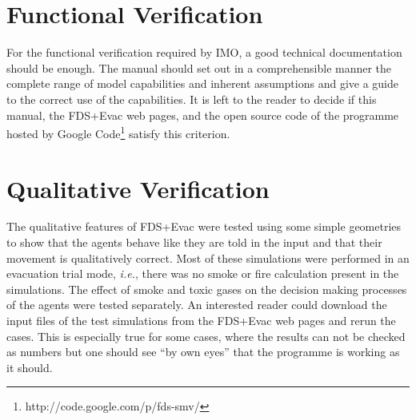 \documentclass[12pt,a4paper,final,twoside]{stylevk}
\begin{document}
\section{Functional Verification}\label{Sec_FuncVeri}

\noindent For the functional verification required by IMO, a good
technical documentation should be enough.  The manual should set out
in a comprehensible manner the complete range of model capabilities
and inherent assumptions and give a guide to the correct use of the
capabilities.  It is left to the reader to decide if this manual, the
FDS+Evac web pages, and the open source code of the programme hosted
by Google Code\footnote{http://code.google.com/p/fds-smv/} satisfy
this criterion.


\section{Qualitative Verification}\label{Sec_QualVeri}

\noindent The qualitative features of FDS+Evac were tested using some
simple geometries to show that the agents behave like they are told in
the input and that their movement is qualitatively correct.  Most of
these simulations were performed in an evacuation trial mode,
\emph{i.e.}, there was no smoke or fire calculation present in the
simulations.  The effect of smoke and toxic gases on the decision
making processes of the agents were tested separately.  An interested
reader could download the input files of the test simulations from the
FDS+Evac web pages and rerun the cases.  This is especially true for
some cases, where the results can not be checked as numbers but one
should see ``by own eyes'' that the programme is working as it should.
\end{document}
